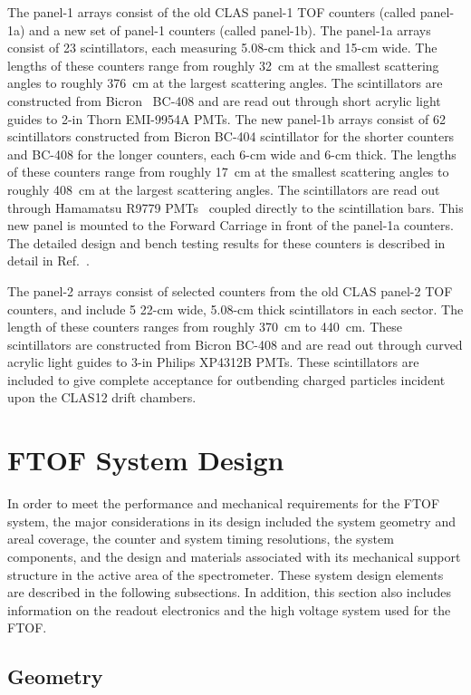 \documentclass{elsart}
\begin{document}
The panel-1 arrays consist of the old CLAS panel-1 TOF counters (called panel-1a) and a new set of panel-1
counters (called panel-1b).  The panel-1a arrays consist of 23 scintillators, each measuring 5.08-cm thick
and 15-cm wide.  The lengths of these counters range from roughly 32~cm at the smallest scattering angles
to roughly 376~cm at the largest scattering angles.  The scintillators are constructed from Bicron~\cite{bicron}
BC-408 and are read out through short acrylic light guides to 2-in Thorn EMI-9954A PMTs.  The new panel-1b
arrays consist of 62 scintillators constructed from Bicron BC-404 scintillator for the shorter counters and
BC-408 for the longer counters, each 6-cm wide and 6-cm thick. The lengths of these counters range from
roughly 17~cm at the smallest scattering angles to roughly 408~cm at the largest scattering angles. The
scintillators are read out through Hamamatsu R9779 PMTs~\cite{hamamatsu} coupled directly to the
scintillation bars. This new panel is mounted to the Forward Carriage in front of the panel-1a counters. The
detailed design and bench testing results for these counters is described in detail in Ref.~\cite{nim-p1b}.

The panel-2 arrays consist of selected counters from the old CLAS panel-2 TOF counters, and include 5
22-cm wide, 5.08-cm thick scintillators in each sector.  The length of these counters ranges from roughly
370~cm to 440~cm.  These scintillators are constructed from Bicron BC-408 and are read out through curved
acrylic light guides to 3-in Philips XP4312B PMTs. These scintillators are included to give complete acceptance
for outbending charged particles incident upon the CLAS12 drift chambers.  

\section{FTOF System Design}
\label{sec:design}

In order to meet the performance and mechanical requirements for the FTOF system, the major
considerations in its design included the system geometry and areal coverage, the counter and system
timing resolutions, the system components, and the design and materials associated with its mechanical
support structure in the active area of the spectrometer. These system design elements are described
in the following subsections. In addition, this section also includes information on the readout electronics
and the high voltage system used for the FTOF.

\subsection{Geometry}
\label{ftof-geometry}
\end{document}

